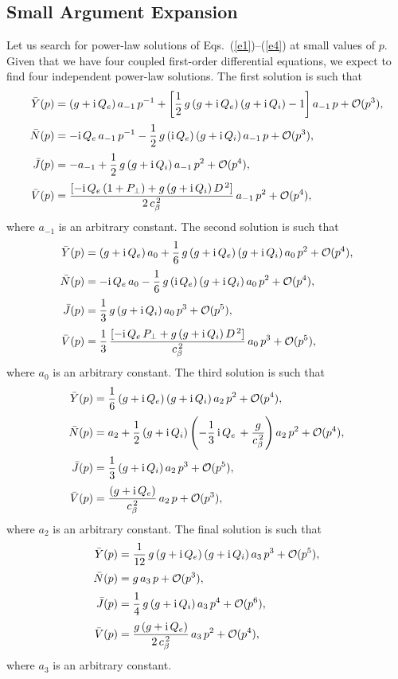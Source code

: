 \documentclass[12pt,prb,aps]{revtex4-1}
\begin{document}
\subsection{Small Argument Expansion}
Let us search for power-law solutions of Eqs.~(\ref{e1})--(\ref{e4}) at small values of $p$. Given that we have four coupled first-order differential equations,
we expect to find four independent power-law solutions.
The first solution is
such that
\begin{align}
\bar{Y}(p) &= (g+{\rm i}\,Q_e)\,a_{-1}\,p^{-1} + \left[\frac{1}{2}\,g\,(g+{\rm i}\,Q_e)\,(g+{\rm i}\,Q_i) - 1\right]a_{-1}\,p +{\cal O}(p^3),\\[0.5ex]
\bar{N}(p)&= -{\rm i}\,Q_e\,a_{-1}\, p^{-1} - \frac{1}{2}\,g\,({\rm i}\,Q_e)\,(g+{\rm i}\,Q_i)\,a_{-1}\,p + {\cal O}(p^3),\\[0.5ex]
\bar{J}(p)&= -a_{-1}+ \frac{1}{2}\,g\,(g+{\rm i}\,Q_i)\,a_{-1}\,p^2 +{\cal O}(p^4),\\[0.5ex]
\bar{V}(p)&= \frac{[-{\rm i}\,Q_e\,(1+P_\perp) + g\,(g+{\rm i}\,Q_i)\,D^{\,2}]}{2\,c_\beta^{\,2}}\,a_{-1}\,p^2+{\cal O}(p^4),
\end{align}
where $a_{-1}$ is an arbitrary constant. 
The second solution is such that
\begin{align}
\bar{Y}(p) &= (g+{\rm i}\,Q_e)\,a_0+\frac{1}{6}\,g\,(g+{\rm i}\,Q_e)\,(g+{\rm i}\,Q_i)\,a_0\,p^2 +{ \cal O}(p^4),\\[0.5ex]
\bar{N}(p) &= -{\rm i}\,Q_e\,a_0-\frac{1}{6}\,g\,({\rm i}\,Q_e)\,(g+{\rm i}\,Q_i)\,a_0\,p^2+{\cal O}(p^4),\\[0.5ex]
\bar{J}(p)&= \frac{1}{3}\,g\,(g+{\rm i}\,Q_i)\,a_0\,p^3+{\cal O}(p^5),\\[0.5ex]
\bar{V}(p)&= \frac{1}{3}\,\frac{[-{\rm i}\,Q_e\,P_\perp + g\,(g+{\rm i }\,Q_i)\,D^{\,2}]}{c_\beta^{\,2}}\,a_0\,p^3+{\cal O}(p^5),
\end{align}
where $a_0$ is an arbitrary constant. 
The third solution is such that
\begin{align}
\bar{Y}(p) &= \frac{1}{6}\,(g+{\rm i}\,Q_e)\,(g+{\rm i}\,Q_i)\,a_2\,p^2+{\cal O}(p^4),\\[0.5ex]
\bar{N}(p) &= a_2+\frac{1}{2}\,(g+{\rm i}\,Q_i)\left(-\frac{1}{3}\,{\rm i}\,Q_e\,+ \frac{g}{c_\beta^{\,2}}\right)a_2\,p^2+{\cal O}(p^4),\\[0.5ex]
\bar{J}(p) &=\frac{1}{3}\,(g+{\rm i}\,Q_i)\,a_2\,p^3+{\cal O}(p^5),\\[0.5ex]
\bar{V}(p) &=\frac{(g+{\rm i}\,Q_e)}{c_\beta^{\,2}}\,a_2\,p+{\cal O}(p^3),
\end{align}
where $a_2$ is an arbitrary constant. 
The final solution is such that
\begin{align}
\bar{Y}(p)& = \frac{1}{12}\,g\,(g+{\rm i}\,Q_e)\,(g+{\rm i}\,Q_i)\,a_3\,p^3+{\cal O}(p^5),\\[0.5ex]
\bar{N}(p) &= g\,a_3\,p+{\cal O}(p^3),\\[0.5ex]
\bar{J}(p)&= \frac{1}{4}\,g\,(g+{\rm i}\,Q_i)\,a_3\,p^4+{\cal O}(p^6),\\[0.5ex]
\bar{V}(p) &= \frac{g\,(g+{\rm i}\,Q_e)}{2\,c_\beta^{\,2}}\,a_3\,p^2+{\cal O}(p^4),
\end{align}
where $a_3$ is an arbitrary constant. 
\end{document}
